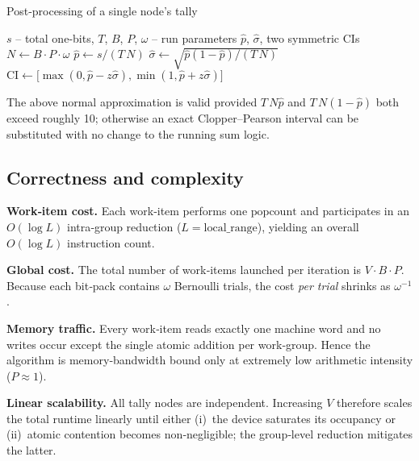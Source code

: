 \begin{algorithm}[H]
\caption{Post‑processing of a single node’s tally}
\label{alg:update_stats}
\begin{algorithmic}[1]
  \Require
    \(s\) – total one‑bits,
    \(T\), \(B\), \(P\), \(\omega\) – run parameters
  \Ensure
    \(\widehat{p}\), \(\widehat{\sigma}\), two symmetric CIs
  \State $N\gets B\cdot P\cdot\omega$
  \State $\widehat{p}\gets s / (T\,N)$
  \State $\widehat{\sigma}\gets
          \sqrt{\widehat{p}(1-\widehat{p})/(T\,N)}$
      \State $\text{CI}\gets
        \bigl[\max(0,\widehat{p}-z\widehat{\sigma}),
              \min(1,\widehat{p}+z\widehat{\sigma})\bigr]$
  \EndFor
\end{algorithmic}
\end{algorithm}

The above normal approximation is valid provided \(T\,N\widehat{p}\)
and \(T\,N(1-\widehat{p})\) both exceed roughly 10; otherwise an exact
Clopper–Pearson interval can be substituted with no change to the running
sum logic.

\subsection{Correctness and complexity}

\textbf{Work‑item cost.}
Each work‑item performs one \(\mathrm{popcount}\) and
participates in an \(O(\log L)\) intra‑group reduction
(\(L\!=\!\text{local\_range}\)), yielding an overall
\(O(\log L)\) instruction count.

\textbf{Global cost.}
The total number of work‑items launched per iteration is
\(V\cdot B\cdot P\).  Because each bit‑pack contains \(\omega\) Bernoulli
trials, the cost \emph{per trial} shrinks as \(\omega^{-1}\).

\textbf{Memory traffic.}
Every work‑item reads exactly one machine word and no writes occur except
the single atomic addition per work‑group.  Hence the algorithm is
memory‑bandwidth bound only at extremely low arithmetic intensity
(\(P\approx 1\)).

\textbf{Linear scalability.}
All tally nodes are independent.  Increasing \(V\) therefore scales the total
runtime linearly until either (i)~the device saturates its occupancy or
(ii)~atomic contention becomes non‑negligible; the group‑level reduction
mitigates the latter.